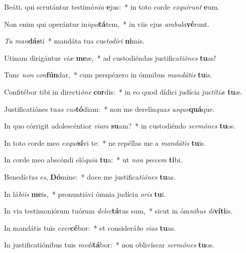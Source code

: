 \item Beáti, qui scrutántur testimó\textit{ni}\textit{a} \textbf{e}jus:~* in toto corde \textit{ex}\textit{quí}\textit{runt} \textbf{e}um.
\item Non enim qui operántur in\textit{i}\textit{qui}\textbf{tá}tem,~* in viis ejus \textit{am}\textit{bu}\textit{la}\textbf{vé}runt.
\item \textit{Tu} \textit{man}\textbf{dás}ti~* mandáta tua cus\textit{to}\textit{dí}\textit{ri} \textbf{ni}mis.
\item Utinam dirigántur \textit{vi}\textit{æ} \textbf{me}æ,~* ad custodiéndas justifica\textit{ti}\textit{ó}\textit{nes} \textbf{tu}as!
\item Tunc \textit{non} \textit{con}\textbf{fún}dar,~* cum perspéxero in ómnibus \textit{man}\textit{dá}\textit{tis} \textbf{tu}is.
\item Confitébor tibi in directi\textit{ó}\textit{ne} \textbf{cor}dis:~* in eo quod dídici judícia jus\textit{tí}\textit{ti}\textit{æ} \textbf{tu}æ.
\item Justificatiónes tu\textit{as} \textit{cus}\textbf{tó}diam:~* non me derelín\textit{quas} \textit{us}\textit{que}\textbf{quá}que.
\item In quo córrigit adolescéntior \textit{vi}\textit{am} \textbf{su}am?~* in custodiéndo \textit{ser}\textit{mó}\textit{nes} \textbf{tu}os.
\item In toto corde meo \textit{ex}\textit{qui}\textbf{sí}vi te:~* ne repéllas me a \textit{man}\textit{dá}\textit{tis} \textbf{tu}is.
\item In corde meo abscóndi eló\textit{qui}\textit{a} \textbf{tu}a:~* ut \textit{non} \textit{pec}\textit{cem} \textbf{ti}bi.
\item Benedíc\textit{tus} \textit{es}, \textbf{Dó}mine:~* doce me justifica\textit{ti}\textit{ó}\textit{nes} \textbf{tu}as.
\item In lá\textit{bi}\textit{is} \textbf{me}is,~* pronuntiávi ómnia judíci\textit{a} \textit{o}\textit{ris} \textbf{tu}i.
\item In via testimoniórum tuórum \textit{de}\textit{lec}\textbf{tá}tus sum,~* sicut in óm\textit{ni}\textit{bus} \textit{di}\textbf{ví}\textbf{ti}is.
\item In mandátis tuis \textit{ex}\textit{er}\textbf{cé}bor:~* et considerá\textit{bo} \textit{vi}\textit{as} \textbf{tu}as.
\item In justificatiónibus tuis \textit{me}\textit{di}\textbf{tá}bor:~* non oblivíscar \textit{ser}\textit{mó}\textit{nes} \textbf{tu}os.
